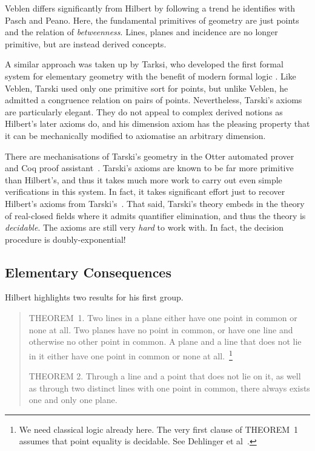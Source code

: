 Veblen differs significantly from Hilbert by following a trend he identifies with Pasch and Peano. Here, the fundamental primitives of geometry are just points and the relation of \emph{betweenness}. Lines, planes and incidence are no longer primitive, but are instead derived concepts.

A similar approach was taken up by Tarksi, who developed the first formal system for elementary geometry with the benefit of modern formal logic \cite{TarskiGeometrySystem}. Like Veblen, Tarski used only one primitive sort for points, but unlike Veblen, he admitted a congruence relation on pairs of points. Nevertheless, Tarski's axioms are particularly elegant. They do not appeal to complex derived notions as Hilbert's later axioms do, and his dimension axiom has the pleasing property that it can be mechanically modified to axiomatise an arbitrary dimension.

There are mechanisations of Tarski's geometry in the Otter automated prover~\cite{QuaifeTarski} and Coq proof assistant~\cite{NarbouxTarski}. Tarski's axioms are known to be far more primitive than Hilbert's, and thus it takes much more work to carry out even simple verifications in this system. In fact, it takes significant effort just to recover Hilbert's axioms from Tarski's~\cite{NarbouxTarskiHilbert}. That said, Tarski's theory embeds in the theory of real-closed fields where it admits quantifier elimination, and thus the theory is \emph{decidable}. The axioms are still very \emph{hard} to work with. In fact, the decision procedure is doubly-exponential!~\cite{QuantifierEliminationComplexity}

\subsection{Elementary Consequences}
Hilbert highlights two results for his first group.

\begin{quotation}
  THEOREM~1. Two lines in a plane either have one point in common or none at all. Two planes have no point in common, or have one line and otherwise no other point in common. A plane and a line that does not lie in it either have one point in common or none at all.~\footnote{We need classical logic already here. The very first clause of THEOREM~1 assumes that point equality is decidable. See Dehlinger et al~\cite{DehlingerFOG}.}

  THEOREM 2. Through a line and a point that does not lie on it, as well as through two distinct lines with one point in common, there always exists one and only one plane.
\end{quotation}

